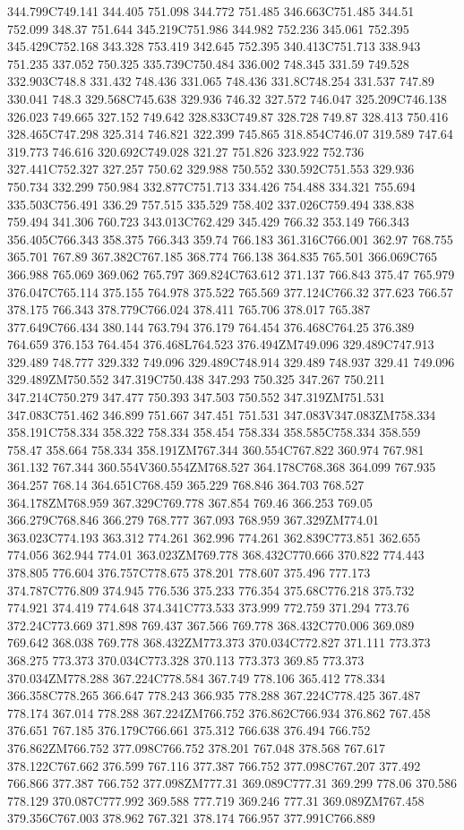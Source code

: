 344.799C749.141 344.405 751.098 344.772 751.485 346.663C751.485 344.51 752.099 348.37 751.644 345.219C751.986 344.982 752.236 345.061 752.395 345.429C752.168 343.328 753.419 342.645 752.395 340.413C751.713 338.943 751.235 337.052 750.325 335.739C750.484 336.002 748.345 331.59 749.528 332.903C748.8 331.432 748.436 331.065 748.436 331.8C748.254 331.537 747.89 330.041 748.3 329.568C745.638 329.936 746.32 327.572 746.047 325.209C746.138 326.023 749.665 327.152 749.642 328.833C749.87 328.728 749.87 328.413 750.416 328.465C747.298 325.314 746.821 322.399 745.865 318.854C746.07 319.589 747.64 319.773 746.616 320.692C749.028 321.27 751.826 323.922 752.736 327.441C752.327 327.257 750.62 329.988 750.552 330.592C751.553 329.936 750.734 332.299 750.984 332.877C751.713 334.426 754.488 334.321 755.694 335.503C756.491 336.29 757.515 335.529 758.402 337.026C759.494 338.838 759.494 341.306 760.723 343.013C762.429 345.429 766.32 353.149 766.343 356.405C766.343 358.375 766.343 359.74 766.183 361.316C766.001 362.97 768.755 365.701 767.89 367.382C767.185 368.774 766.138 364.835 765.501 366.069C765 366.988 765.069 369.062 765.797 369.824C763.612 371.137 766.843 375.47 765.979 376.047C765.114 375.155 764.978 375.522 765.569 377.124C766.32 377.623 766.57 378.175 766.343 378.779C766.024 378.411 765.706 378.017 765.387 377.649C766.434 380.144 763.794 376.179 764.454 376.468C764.25 376.389 764.659 376.153 764.454 376.468L764.523 376.494ZM749.096 329.489C747.913 329.489 748.777 329.332 749.096 329.489C748.914 329.489 748.937 329.41 749.096 329.489ZM750.552 347.319C750.438 347.293 750.325 347.267 750.211 347.214C750.279 347.477 750.393 347.503 750.552 347.319ZM751.531 347.083C751.462 346.899 751.667 347.451 751.531 347.083V347.083ZM758.334 358.191C758.334 358.322 758.334 358.454 758.334 358.585C758.334 358.559 758.47 358.664 758.334 358.191ZM767.344 360.554C767.822 360.974 767.981 361.132 767.344 360.554V360.554ZM768.527 364.178C768.368 364.099 767.935 364.257 768.14 364.651C768.459 365.229 768.846 364.703 768.527 364.178ZM768.959 367.329C769.778 367.854 769.46 366.253 769.05 366.279C768.846 366.279 768.777 367.093 768.959 367.329ZM774.01 363.023C774.193 363.312 774.261 362.996 774.261 362.839C773.851 362.655 774.056 362.944 774.01 363.023ZM769.778 368.432C770.666 370.822 774.443 378.805 776.604 376.757C778.675 378.201 778.607 375.496 777.173 374.787C776.809 374.945 776.536 375.233 776.354 375.68C776.218 375.732 774.921 374.419 774.648 374.341C773.533 373.999 772.759 371.294 773.76 372.24C773.669 371.898 769.437 367.566 769.778 368.432C770.006 369.089 769.642 368.038 769.778 368.432ZM773.373 370.034C772.827 371.111 773.373 368.275 773.373 370.034C773.328 370.113 773.373 369.85 773.373 370.034ZM778.288 367.224C778.584 367.749 778.106 365.412 778.334 366.358C778.265 366.647 778.243 366.935 778.288 367.224C778.425 367.487 778.174 367.014 778.288 367.224ZM766.752 376.862C766.934 376.862 767.458 376.651 767.185 376.179C766.661 375.312 766.638 376.494 766.752 376.862ZM766.752 377.098C766.752 378.201 767.048 378.568 767.617 378.122C767.662 376.599 767.116 377.387 766.752 377.098C767.207 377.492 766.866 377.387 766.752 377.098ZM777.31 369.089C777.31 369.299 778.06 370.586 778.129 370.087C777.992 369.588 777.719 369.246 777.31 369.089ZM767.458 379.356C767.003 378.962 767.321 378.174 766.957 377.991C766.889 